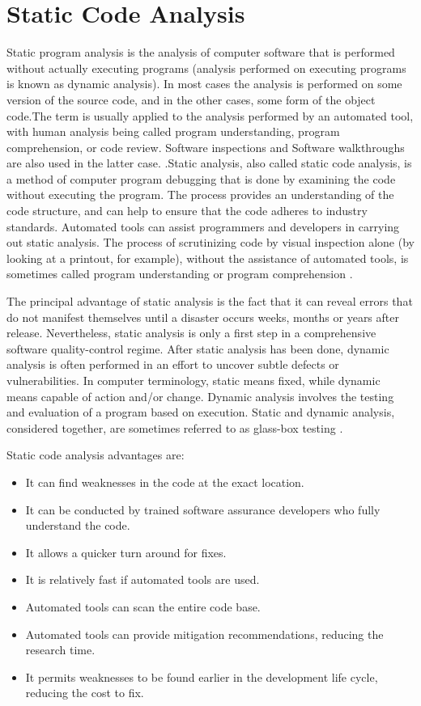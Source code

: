 \section{Static Code Analysis}

Static program analysis is the analysis of computer software that is performed without actually executing programs (analysis performed on executing programs is known as dynamic analysis). In most cases the analysis is performed on some version of the source code, and in the other cases, some form of the object code.The term is usually applied to the analysis performed by an automated tool, with human analysis being called program understanding, program comprehension, or code review. Software inspections and Software walkthroughs are also used in the latter case. .Static analysis, also called static code analysis, is a method of computer program debugging that is done by examining the code without executing the program. The process provides an understanding of the code structure, and can help to ensure that the code adheres to industry standards. Automated tools can assist programmers and developers in carrying out static analysis. The process of scrutinizing code by visual inspection alone (by looking at a printout, for example), without the assistance of automated tools, is sometimes called program understanding or program comprehension \cite{ref_86_techtarget:techtarget}.

The principal advantage of static analysis is the fact that it can reveal errors that do not manifest themselves until a disaster occurs weeks, months or years after release. Nevertheless, static analysis is only a first step in a comprehensive software quality-control regime. After static analysis has been done, dynamic analysis is often performed in an effort to uncover subtle defects or vulnerabilities. In computer terminology, static means fixed, while dynamic means capable of action and/or change. Dynamic analysis involves the testing and evaluation of a program based on execution. Static and dynamic analysis, considered together, are sometimes referred to as glass-box testing \cite{ref_86_techtarget:techtarget}.

Static code analysis advantages are:
\begin{itemize}
	\item It can find weaknesses in the code at the exact location.
	\item It can be conducted by trained software assurance developers who fully understand the code.
	\item It allows a quicker turn around for fixes.
	\item It is relatively fast if automated tools are used.
	\item Automated tools can scan the entire code base.
	\item Automated tools can provide mitigation recommendations, reducing the research time.
	\item It permits weaknesses to be found earlier in the development life cycle, reducing the cost to fix.
\end{itemize}

